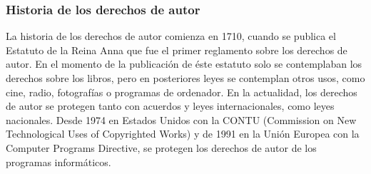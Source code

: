 \documentclass{article}
\begin{document}
\subsubsection{Historia de los derechos de autor}
La historia de los derechos de autor comienza en 1710, cuando se publica el Estatuto de la Reina
Anna\cite{estatuto_anna} que fue el primer reglamento sobre los derechos de autor. En el momento de la publicación
de éste estatuto solo se contemplaban los derechos sobre los libros, pero en posteriores leyes se contemplan otros
usos, como cine, radio, fotografías o programas de ordenador.\newline
En la actualidad, los derechos de autor se protegen tanto con acuerdos y leyes internacionales, como leyes
nacionales.\newline
Desde 1974 en Estados Unidos con la CONTU\cite{contu} (Commission on New Technological Uses of Copyrighted Works) y
de 1991 en la Unión Europea con la Computer Programs Directive\cite{com_pro_dir}, se protegen los derechos de autor
de los programas informáticos.
\end{document}
